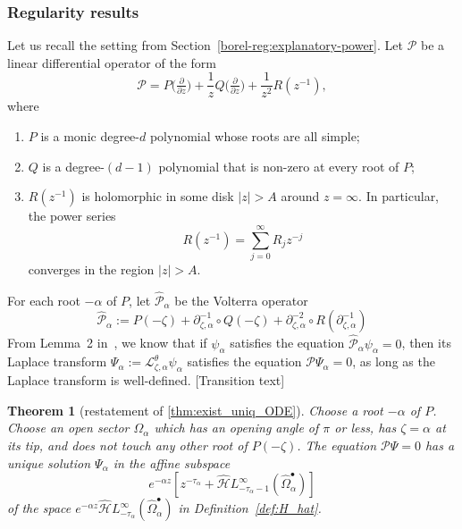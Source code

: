 \documentclass{article}
\newcommand{\dualsingexp}[1]{\widehat{\mathcal{H}}L^\infty_{#1}}
\newcommand{\laplace}{\mathcal{L}}
\theoremstyle{definition}
\theoremstyle{plain}
\newtheorem{theorem}{Theorem}[section]
\newenvironment{todo}{\color{Coral}}{\color{black}}
\begin{document}
\subsubsection{Regularity results}\label{sec:regularity-results}
Let us recall the setting from Section~\ref{borel-reg:explanatory-power}. Let $\mathcal{P}$ be a linear differential operator of the form 
\begin{equation}\label{eqn:operator-P}
\mathcal{P} = P\big(\tfrac{\partial}{\partial z}\big) + \frac{1}{z} Q\big(\tfrac{\partial}{\partial z}\big) + \frac{1}{z^2} R(z^{-1}),
\end{equation}
where
\begin{enumerate}
\item $P$ is a monic degree-$d$ polynomial whose roots are all simple; 
\item $Q$ is a degree-$(d-1)$ polynomial that is non-zero at every root of $P$;
\item $R(z^{-1})$ is holomorphic in some disk $|z| > A$ around $z = \infty$. In particular, the power series
\[ R(z^{-1}) = \sum_{j=0}^\infty R_j z^{-j} \]
converges in the region $|z| > A$.
\end{enumerate}
For each root $-\alpha$ of $P$, let $\hat{\mathcal{P}}_{\alpha}$ be the Volterra operator 
\begin{equation}\label{eq:hat_P}
    \hat{\mathcal{P}}_\alpha:=P(-\zeta)+\partial_{\zeta,\alpha}^{-1}\circ Q(-\zeta)+\partial_{\zeta,\alpha}^{-2}\circ R(\partial_{\zeta,\alpha}^{-1})
\end{equation}
From Lemma~2 in~\cite{reg-sing-volterra}, we know that if $\psi_\alpha$ satisfies the equation $\hat{\mathcal{P}}_\alpha\psi_\alpha=0$, then its Laplace transform $\Psi_\alpha:=\laplace_{\zeta,\alpha}^{\theta}\psi_\alpha$ satisfies the equation $\mathcal{P}\Psi_\alpha=0$, as long as the Laplace transform is well-defined. \begin{todo}[Transition text]\end{todo}
\begin{theorem}[restatement of \ref{thm:exist_uniq_ODE}]\label{re:thm:exist_uniq_ODE}
Choose a root $-\alpha$ of $P$. Choose an open sector $\Omega_\alpha$ which has an opening angle of $\pi$ or less, has $\zeta = \alpha$ at its tip, and does not touch any other root of $P(-\zeta)$. The equation $\mathcal{P}\Psi = 0$ has a unique solution $\Psi_\alpha$ in the affine subspace
\[ e^{-\alpha z} \left[ z^{-\tau_\alpha} + \dualsingexp{-\tau_\alpha-1}(\widehat{\Omega}_\alpha^\bullet) \right] \]
of the space $e^{-\alpha z} \dualsingexp{-\tau_\alpha}(\widehat{\Omega}_\alpha^\bullet)$ in Definition~\ref{def:H_hat}.
\end{theorem}
\end{document}
